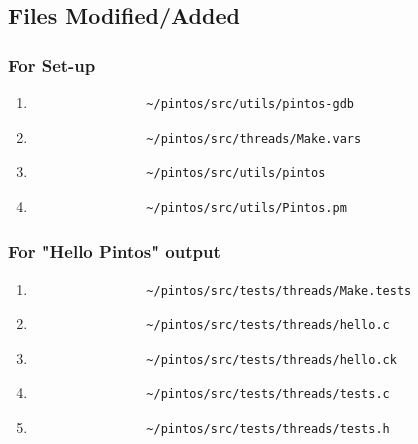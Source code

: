 \documentclass[]{article}
\begin{document}
	\subsection{Files Modified/Added}
		\subsubsection{For Set-up}
			\begin{enumerate}
				\item \begin{verbatim}
				~/pintos/src/utils/pintos-gdb
				\end{verbatim}
				\item \begin{verbatim}
				~/pintos/src/threads/Make.vars
				\end{verbatim}
				\item \begin{verbatim}
				~/pintos/src/utils/pintos
				\end{verbatim}		
				\item \begin{verbatim}
				~/pintos/src/utils/Pintos.pm
				\end{verbatim}	
			\end{enumerate}
		
		\subsubsection{For "Hello Pintos" output}
			\begin{enumerate}
				\item \begin{verbatim}
				~/pintos/src/tests/threads/Make.tests 
				\end{verbatim}
				\item \begin{verbatim}
				~/pintos/src/tests/threads/hello.c
				\end{verbatim}
				\item \begin{verbatim}
				~/pintos/src/tests/threads/hello.ck
				\end{verbatim}
				\item \begin{verbatim}
				~/pintos/src/tests/threads/tests.c
				\end{verbatim}
				\item \begin{verbatim}
				~/pintos/src/tests/threads/tests.h
				\end{verbatim}
			\end{enumerate}	
	
\end{document}
